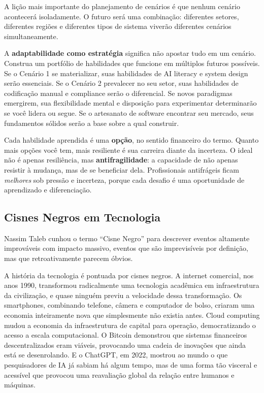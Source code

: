 A lição mais importante do planejamento de cenários é que nenhum cenário acontecerá isoladamente. O futuro será uma combinação: diferentes setores, diferentes regiões e diferentes tipos de sistema viverão diferentes cenários simultaneamente.

A \textbf{adaptabilidade como estratégia} significa não apostar tudo em um cenário. Construa um portfólio de habilidades que funcione em múltiplos futuros possíveis. Se o Cenário 1 se materializar, suas habilidades de AI literacy e system design serão essenciais. Se o Cenário 2 prevalecer no seu setor, suas habilidades de codificação manual e compliance serão o diferencial. Se novos paradigmas emergirem, sua flexibilidade mental e disposição para experimentar determinarão se você lidera ou segue. Se o artesanato de software encontrar seu mercado, seus fundamentos sólidos serão a base sobre a qual construir.

Cada habilidade aprendida é uma \textbf{opção}, no sentido financeiro do termo. Quanto mais opções você tem, mais resiliente é sua carreira diante da incerteza. O ideal não é apenas resiliência, mas \textbf{antifragilidade}: a capacidade de não apenas resistir à mudança, mas de se beneficiar dela. Profissionais antifrágeis ficam \textit{melhores} sob pressão e incerteza, porque cada desafio é uma oportunidade de aprendizado e diferenciação.

\subsection{Cisnes Negros em Tecnologia}

Nassim Taleb cunhou o termo ``Cisne Negro'' para descrever eventos altamente improváveis com impacto massivo, eventos que são imprevisíveis por definição, mas que retroativamente parecem óbvios.

A história da tecnologia é pontuada por cisnes negros. A internet comercial, nos anos 1990, transformou radicalmente uma tecnologia acadêmica em infraestrutura da civilização, e quase ninguém previu a velocidade dessa transformação. Os smartphones, combinando telefone, câmera e computador de bolso, criaram uma economia inteiramente nova que simplesmente não existia antes. Cloud computing mudou a economia da infraestrutura de capital para operação, democratizando o acesso a escala computacional. O Bitcoin demonstrou que sistemas financeiros descentralizados eram viáveis, provocando uma cadeia de inovações que ainda está se desenrolando. E o ChatGPT, em 2022, mostrou ao mundo o que pesquisadores de IA já sabiam há algum tempo, mas de uma forma tão visceral e acessível que provocou uma reavaliação global da relação entre humanos e máquinas.

